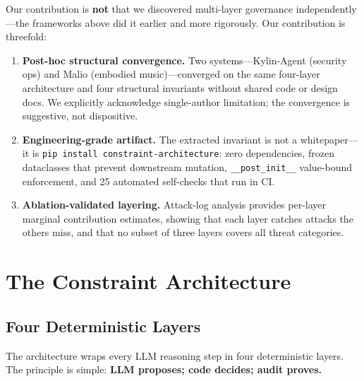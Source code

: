\documentclass[letterpaper]{article}
\begin{document}
Our contribution is \textbf{not} that we discovered multi-layer governance
independently---the frameworks above did it earlier and more rigorously.
Our contribution is threefold:

\begin{enumerate}
\item \textbf{Post-hoc structural convergence.} Two systems---Kylin-Agent
      (security ops) and Malio (embodied music)---converged on the same
      four-layer architecture and four structural invariants without shared
      code or design docs.  We explicitly acknowledge single-author limitation;
      the convergence is suggestive, not dispositive.
\item \textbf{Engineering-grade artifact.} The extracted invariant is not a
      whitepaper---it is \texttt{pip install constraint-architecture}: zero
      dependencies, frozen dataclasses that prevent downstream mutation,
      \texttt{\_\_post\_init\_\_} value-bound enforcement, and 25 automated
      self-checks that run in CI.
\item \textbf{Ablation-validated layering.} Attack-log analysis provides
      per-layer marginal contribution estimates, showing that each layer
      catches attacks the others miss, and that no subset of three layers
      covers all threat categories.
\end{enumerate}

\section{The Constraint Architecture}

\subsection{Four Deterministic Layers}

The architecture wraps every LLM reasoning step in four deterministic layers.
The principle is simple: \textbf{LLM proposes; code decides; audit proves.}
\end{document}
